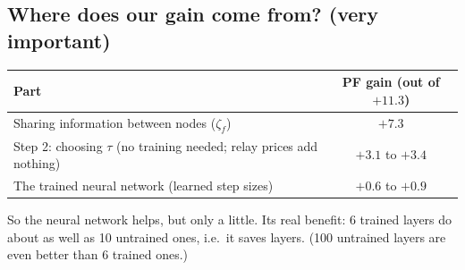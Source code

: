 \documentclass[11pt,a4paper]{article}
\begin{document}
\subsection*{Where does our gain come from? (very important)}
\begin{center}
\begin{tabular}{lc}
\toprule
Part & PF gain (out of $+11.3$) \\
\midrule
Sharing information between nodes ($\zeta_f$) & $+7.3$ \\
Step 2: choosing $\tau$ (no training needed; relay prices add nothing) & $+3.1$ to $+3.4$ \\
The trained neural network (learned step sizes) & $+0.6$ to $+0.9$ \\
\bottomrule
\end{tabular}
\end{center}
So the neural network helps, but only a little. Its real benefit: 6 trained layers do about as well as 10
untrained ones, i.e.\ it saves layers. (100 untrained layers are even better than 6 trained ones.)

\end{document}
